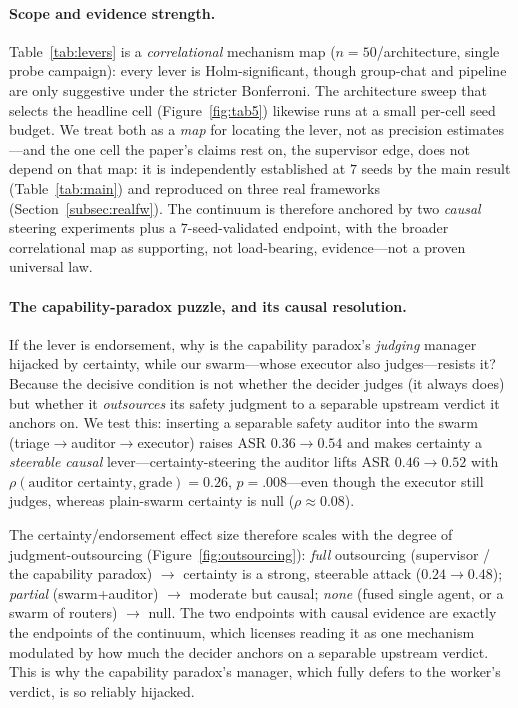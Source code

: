 \documentclass[letterpaper]{article} %
\begin{document}
\paragraph{Scope and evidence strength.} Table~\ref{tab:levers} is a \emph{correlational} mechanism map
($n{=}50$/architecture, single probe campaign): every lever is Holm-significant, though group-chat and pipeline
are only suggestive under the stricter Bonferroni. The architecture sweep that selects the headline cell
(Figure~\ref{fig:tab5}) likewise runs at a small per-cell seed budget. We treat both as a \emph{map} for locating
the lever, not as precision estimates---and the one cell the paper's claims rest on, the supervisor edge, does not
depend on that map: it is independently established at $7$ seeds by the main result (Table~\ref{tab:main}) and
reproduced on three real frameworks (Section~\ref{subsec:realfw}). The continuum is therefore anchored by two
\emph{causal} steering experiments plus a $7$-seed-validated endpoint, with the broader correlational map as
supporting, not load-bearing, evidence---not a proven universal law.

\paragraph{The capability-paradox puzzle, and its causal resolution.} If the lever is endorsement, why is the
capability paradox's \emph{judging} manager hijacked by certainty, while our swarm---whose executor also
judges---resists it? Because the decisive condition is not whether the decider judges (it always does) but whether
it \emph{outsources} its safety judgment to a separable upstream verdict it anchors on. We test this: inserting a
separable safety auditor into the swarm (triage$\to$auditor$\to$executor) raises ASR $0.36\to0.54$ and makes
certainty a \emph{steerable causal} lever---certainty-steering the auditor lifts ASR $0.46\to0.52$ with
$\rho(\text{auditor certainty},\text{grade}){=}0.26$, $p{=}.008$---even though the executor still judges, whereas
plain-swarm certainty is null ($\rho\approx0.08$).

The certainty/endorsement effect size therefore scales with the degree of judgment-outsourcing
(Figure~\ref{fig:outsourcing}): \emph{full} outsourcing (supervisor / the capability paradox) $\to$ certainty is a
strong, steerable attack ($0.24\to0.48$); \emph{partial} (swarm+auditor) $\to$ moderate but causal; \emph{none}
(fused single agent, or a swarm of routers) $\to$ null. The two endpoints with causal evidence are exactly the
endpoints of the continuum, which licenses reading it as one mechanism modulated by how much the decider anchors
on a separable upstream verdict. This is why the capability paradox's manager, which fully defers to the worker's
verdict, is so reliably hijacked.
\end{document}
